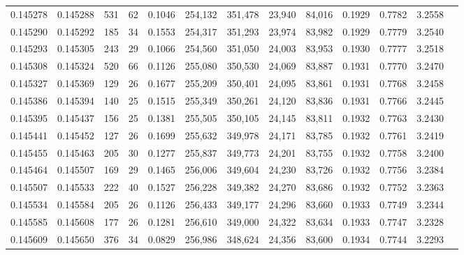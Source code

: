 \begin{tabular}{rrrrrrrrrrrrr}
0.145278 & 0.145288 &   531 &  62 &                                     0.1046 & 254,132 & 351,478 &  23,940 &  84,016 & 0.1929 & 0.7782 & 3.2558 \\
0.145290 & 0.145292 &   185 &  34 &                                     0.1553 & 254,317 & 351,293 &  23,974 &  83,982 & 0.1929 & 0.7779 & 3.2540 \\
0.145293 & 0.145305 &   243 &  29 &                                     0.1066 & 254,560 & 351,050 &  24,003 &  83,953 & 0.1930 & 0.7777 & 3.2518 \\
0.145308 & 0.145324 &   520 &  66 &                                     0.1126 & 255,080 & 350,530 &  24,069 &  83,887 & 0.1931 & 0.7770 & 3.2470 \\
0.145327 & 0.145369 &   129 &  26 &                                     0.1677 & 255,209 & 350,401 &  24,095 &  83,861 & 0.1931 & 0.7768 & 3.2458 \\
0.145386 & 0.145394 &   140 &  25 &                                     0.1515 & 255,349 & 350,261 &  24,120 &  83,836 & 0.1931 & 0.7766 & 3.2445 \\
0.145395 & 0.145437 &   156 &  25 &                                     0.1381 & 255,505 & 350,105 &  24,145 &  83,811 & 0.1932 & 0.7763 & 3.2430 \\
0.145441 & 0.145452 &   127 &  26 &                                     0.1699 & 255,632 & 349,978 &  24,171 &  83,785 & 0.1932 & 0.7761 & 3.2419 \\
0.145455 & 0.145463 &   205 &  30 &                                     0.1277 & 255,837 & 349,773 &  24,201 &  83,755 & 0.1932 & 0.7758 & 3.2400 \\
0.145464 & 0.145507 &   169 &  29 &                                     0.1465 & 256,006 & 349,604 &  24,230 &  83,726 & 0.1932 & 0.7756 & 3.2384 \\
0.145507 & 0.145533 &   222 &  40 &                                     0.1527 & 256,228 & 349,382 &  24,270 &  83,686 & 0.1932 & 0.7752 & 3.2363 \\
0.145534 & 0.145584 &   205 &  26 &                                     0.1126 & 256,433 & 349,177 &  24,296 &  83,660 & 0.1933 & 0.7749 & 3.2344 \\
0.145585 & 0.145608 &   177 &  26 &                                     0.1281 & 256,610 & 349,000 &  24,322 &  83,634 & 0.1933 & 0.7747 & 3.2328 \\
0.145609 & 0.145650 &   376 &  34 &                                     0.0829 & 256,986 & 348,624 &  24,356 &  83,600 & 0.1934 & 0.7744 & 3.2293 \\

\end{tabular}
